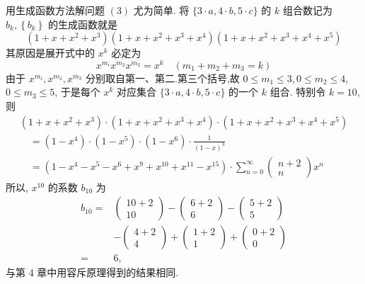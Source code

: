 \documentclass{report}
\begin{document}
用生成函数方法解问题 $(3)$ 尤为简单. 将 $\{3 \cdot a, 4 \cdot b, 5 \cdot c\}$ 的 $k$ 组合数记为 $b_{k},\left\{b_{k}\right\}$ 的生成函数就是
$$
\left(1+x+x^{2}+x^{3}\right)\left(1+x+x^{2}+x^{3}+x^{4}\right)\left(1+x+x^{2}+x^{3}+x^{4}+x^{5}\right)
$$
其原因是展开式中的 $x^{k}$ 必定为
$$
x^{m_{i}} x^{m_{2}} x^{m_{3}}=x^{k} \quad\left(m_{1}+m_{2}+m_{3}=k\right)
$$
由于 $x^{m_{i}}, x^{m_{2}}, x^{m_{3}}$ 分别取自第一、第二.第三个括号,故 $0 \leqslant m_{1} \leqslant 3,0 \leqslant m_{2} \leqslant 4$, $0 \leqslant m_{3} \leqslant 5$, 于是每个 $x^{k}$ 对应集合 $\{3 \cdot a, 4 \cdot b, 5 \cdot c\}$ 的一个 $k$ 组合.
特别令 $k=10$,则
$$
\begin{array}{l}
\left(1+x+x^{2}+x^{3}\right) \cdot\left(1+x+x^{2}+x^{3}+x^{4}\right) \cdot\left(1+x+x^{2}+x^{3}+x^{4}+x^{5}\right) \\
\quad=\left(1-x^{4}\right) \cdot\left(1-x^{5}\right) \cdot\left(1-x^{6}\right) \cdot \frac{1}{(1-x)^{3}} \\
\quad=\left(1-x^{4}-x^{5}-x^{6}+x^{9}+x^{10}+x^{11}-x^{15}\right) \cdot \sum_{n=0}^{\infty}\left(\begin{array}{c}
n+2 \\
n
\end{array}\right) x^{n}
\end{array}
$$
所以, $x^{10}$ 的系数 $b_{10}$ 为
$$
\begin{aligned}
b_{10}=&\left(\begin{array}{c}
10+2 \\
10
\end{array}\right)-\left(\begin{array}{c}
6+2 \\
6
\end{array}\right)-\left(\begin{array}{c}
5+2 \\
5
\end{array}\right) \\
&-\left(\begin{array}{c}
4+2 \\
4
\end{array}\right)+\left(\begin{array}{c}
1+2 \\
1
\end{array}\right)+\left(\begin{array}{c}
0+2 \\
0
\end{array}\right) \\
=& 6,
\end{aligned}
$$
与第 4 章中用容斥原理得到的结果相同.
\end{document}
